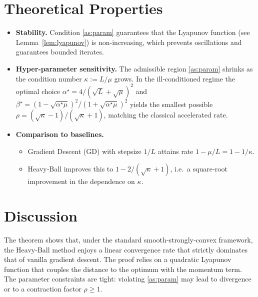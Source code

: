 \documentclass{article}
\begin{document}
\section*{Theoretical Properties}
\begin{itemize}
\item \textbf{Stability.} Condition \eqref{as:param} guarantees that the Lyapunov
function (see Lemma~\ref{lem:lyapunov}) is non‑increasing, which prevents
oscillations and guarantees bounded iterates.
\item \textbf{Hyper‑parameter sensitivity.}
  The admissible region \eqref{as:param} shrinks as the condition number
  $\kappa:=L/\mu$ grows.  In the ill‑conditioned regime the optimal
  choice $\alpha^{\star}=4/(\sqrt{L}+\sqrt{\mu})^{2}$ and
  $\beta^{\star}=(1-\sqrt{\alpha^{\star}\mu})^{2}/(1+\sqrt{\alpha^{\star}\mu})^{2}$
  yields the smallest possible $\rho= ( \sqrt{\kappa}-1 )/(\sqrt{\kappa}+1)$,
  matching the classical accelerated rate.
\item \textbf{Comparison to baselines.}
  \begin{itemize}
    \item Gradient Descent (GD) with stepsize $1/L$ attains rate
          $1-\mu/L=1-1/\kappa$.
    \item Heavy‑Ball improves this to $1-2/(\sqrt{\kappa}+1)$, i.e.\ a square‑root
          improvement in the dependence on $\kappa$.
  \end{itemize}
\end{itemize}

\section*{Discussion}
The theorem shows that, under the standard smooth‑strongly‑convex
framework, the Heavy‑Ball method enjoys a linear convergence rate that
strictly dominates that of vanilla gradient descent.  The proof relies on a
quadratic Lyapunov function that couples the distance to the optimum with the
momentum term.  The parameter constraints are tight: violating \eqref{as:param}
may lead to divergence or to a contraction factor $\rho\ge 1$.

\newpage
\end{document}
